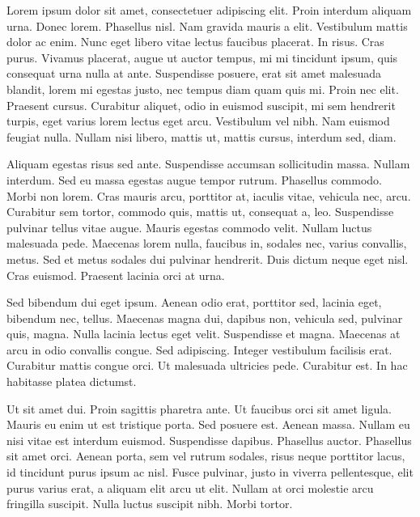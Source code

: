 Lorem ipsum dolor sit amet, consectetuer adipiscing elit. Proin interdum aliquam urna. Donec lorem. Phasellus nisl. Nam gravida mauris a elit. Vestibulum mattis dolor ac enim. Nunc eget libero vitae lectus faucibus placerat. In risus. Cras purus. Vivamus placerat, augue ut auctor tempus, mi mi tincidunt ipsum, quis consequat urna nulla at ante. Suspendisse posuere, erat sit amet malesuada blandit, lorem mi egestas justo, nec tempus diam quam quis mi. Proin nec elit. Praesent cursus. Curabitur aliquet, odio in euismod suscipit, mi sem hendrerit turpis, eget varius lorem lectus eget arcu. Vestibulum vel nibh. Nam euismod feugiat nulla. Nullam nisi libero, mattis ut, mattis cursus, interdum sed, diam.

Aliquam egestas risus sed ante. Suspendisse accumsan sollicitudin massa. Nullam interdum. Sed eu massa egestas augue tempor rutrum. Phasellus commodo. Morbi non lorem. Cras mauris arcu, porttitor at, iaculis vitae, vehicula nec, arcu. Curabitur sem tortor, commodo quis, mattis ut, consequat a, leo. Suspendisse pulvinar tellus vitae augue. Mauris egestas commodo velit. Nullam luctus malesuada pede. Maecenas lorem nulla, faucibus in, sodales nec, varius convallis, metus. Sed et metus sodales dui pulvinar hendrerit. Duis dictum neque eget nisl. Cras euismod. Praesent lacinia orci at urna.

Sed bibendum dui eget ipsum. Aenean odio erat, porttitor sed, lacinia eget, bibendum nec, tellus. Maecenas magna dui, dapibus non, vehicula sed, pulvinar quis, magna. Nulla lacinia lectus eget velit. Suspendisse et magna. Maecenas at arcu in odio convallis congue. Sed adipiscing. Integer vestibulum facilisis erat. Curabitur mattis congue orci. Ut malesuada ultricies pede. Curabitur est. In hac habitasse platea dictumst.

Ut sit amet dui. Proin sagittis pharetra ante. Ut faucibus orci sit amet ligula. Mauris eu enim ut est tristique porta. Sed posuere est. Aenean massa. Nullam eu nisi vitae est interdum euismod. Suspendisse dapibus. Phasellus auctor. Phasellus sit amet orci. Aenean porta, sem vel rutrum sodales, risus neque porttitor lacus, id tincidunt purus ipsum ac nisl. Fusce pulvinar, justo in viverra pellentesque, elit purus varius erat, a aliquam elit arcu ut elit. Nullam at orci molestie arcu fringilla suscipit. Nulla luctus suscipit nibh. Morbi tortor.

